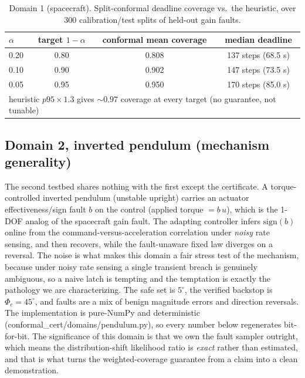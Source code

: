 \documentclass[journal]{IEEEtran}
\theoremstyle{plain}
\theoremstyle{definition}
\begin{document}
\begin{table}[!t]\centering\small
\caption{Domain 1 (spacecraft). Split-conformal deadline coverage vs.\ the heuristic, over 300 calibration/test splits of held-out gain faults.}
\label{tab:spacecraft}
\begin{tabular}{lccc}
\toprule
$\alpha$ & target $1-\alpha$ & conformal mean coverage & median deadline \\
\midrule
0.20 & 0.80 & 0.808 & 137 steps (68.5 s) \\
0.10 & 0.90 & 0.902 & 147 steps (73.5 s) \\
0.05 & 0.95 & 0.950 & 170 steps (85.0 s) \\
\midrule
\multicolumn{4}{l}{\footnotesize heuristic $p95\times1.3$ gives ${\sim}0.97$ coverage at every target (no guarantee, not tunable)} \\
\bottomrule
\end{tabular}
\end{table}

\subsection{Domain 2, inverted pendulum (mechanism generality)}
The second testbed shares nothing with the first except the certificate. A torque-controlled
inverted pendulum (unstable upright) carries an actuator
effectiveness/sign fault $b$ on the control (applied torque $=b\,u$), which is the 1-DOF
analog of the spacecraft gain fault. The adapting controller infers $\mathrm{sign}(b)$ online
from the command-versus-acceleration correlation under \emph{noisy} rate sensing, and then
recovers, while the fault-unaware fixed law diverges on a reversal. The noise is what makes
this domain a fair stress test of the mechanism, because under noisy rate sensing a single
transient breach is genuinely ambiguous, so a naive latch is tempting and the temptation is
exactly the pathology we are characterizing. The safe set is $5^\circ$, the verified backstop
is $\Phi_c=45^\circ$, and faults are a mix of benign magnitude errors and direction
reversals. The implementation is pure-NumPy and deterministic
(conformal\_cert/domains/pendulum.py), so every number below regenerates bit-for-bit. The
significance of this domain is that we own the fault sampler outright, which means the
distribution-shift likelihood ratio is \emph{exact} rather than estimated, and that is what
turns the weighted-coverage guarantee from a claim into a clean demonstration.
\end{document}
